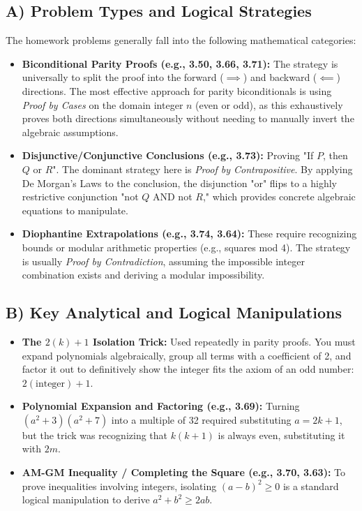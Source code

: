 \documentclass[11pt, letterpaper]{article}
\theoremstyle{definition}
\theoremstyle{remark}
\begin{document}
\subsection{A) Problem Types and Logical Strategies}
The homework problems generally fall into the following mathematical categories:
\begin{itemize}
    \item \textbf{Biconditional Parity Proofs (e.g., 3.50, 3.66, 3.71):} The strategy is universally to split the proof into the forward ($\implies$) and backward ($\impliedby$) directions. The most effective approach for parity biconditionals is using \textit{Proof by Cases} on the domain integer $n$ (even or odd), as this exhaustively proves both directions simultaneously without needing to manually invert the algebraic assumptions.
    \item \textbf{Disjunctive/Conjunctive Conclusions (e.g., 3.73):} Proving "If $P$, then $Q$ or $R$". The dominant strategy here is \textit{Proof by Contrapositive}. By applying De Morgan's Laws to the conclusion, the disjunction "or" flips to a highly restrictive conjunction "not $Q$ AND not $R$," which provides concrete algebraic equations to manipulate.
    \item \textbf{Diophantine Extrapolations (e.g., 3.74, 3.64):} These require recognizing bounds or modular arithmetic properties (e.g., squares mod 4). The strategy is usually \textit{Proof by Contradiction}, assuming the impossible integer combination exists and deriving a modular impossibility.
\end{itemize}

\subsection{B) Key Analytical and Logical Manipulations}
\begin{itemize}
    \item \textbf{The $2(k) + 1$ Isolation Trick:} Used repeatedly in parity proofs. You must expand polynomials algebraically, group all terms with a coefficient of 2, and factor it out to definitively show the integer fits the axiom of an odd number: $2(\text{integer}) + 1$.
    \item \textbf{Polynomial Expansion and Factoring (e.g., 3.69):} Turning $(a^2+3)(a^2+7)$ into a multiple of 32 required substituting $a=2k+1$, but the trick was recognizing that $k(k+1)$ is always even, substituting it with $2m$. 
    \item \textbf{AM-GM Inequality / Completing the Square (e.g., 3.70, 3.63):} To prove inequalities involving integers, isolating $(a-b)^2 \ge 0$ is a standard logical manipulation to derive $a^2+b^2 \ge 2ab$. 
\end{itemize}
\end{document}
